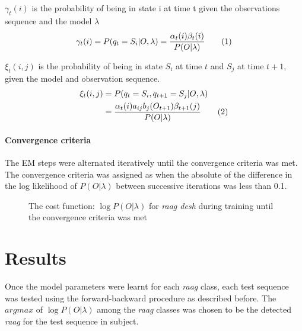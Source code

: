 \documentclass[letterpaper, 10 pt, conference]{ieeeconf}  %
\newcommand\numberthis{\addtocounter{equation}{1}\tag{\theequation}}
\begin{document}
$\gamma_t(i)$ is the probability of being in state i at time t given the observations sequence and the model $\lambda$
\begin{align*}
	\gamma_t(i) =&\; P(q_t = S_i | O, \lambda) = \frac{\alpha_t(i) \beta_t(i)}{P(O | \lambda)} \numberthis \\ 
\end{align*}

$\xi_t(i,j)$ is the probability of being in state $S_i$ at time $t$ and $S_j$ at time $t+1$, given the model and observation sequence. 
\begin{align*}
	\xi_t(i,j) =&\; P(q_t = S_i, q_{t+1} = S_j | O,\lambda) \\
	=&\; \frac{\alpha_t(i) a_{ij} b_j(O_{t+1}) \beta_{t+1}(j)}{P(O|\lambda)} \numberthis \\
\end{align*}

\paragraph{Convergence criteria}
The EM steps were alternated iteratively until the convergence criteria was met. The convergence criteria was assigned as when the absolute of the difference in the log likelihood of $P(O|\lambda)$ between successive iterations was less than 0.1. \\

   \begin{figure}[thpb]
      \centering
      \caption{The cost function: $\log P(O|\lambda)$ for \textit{raag desh} during training until the convergence criteria was met}
      \label{figurelabel}
   \end{figure}

\section{Results}
Once the model parameters were learnt for each \textit{raag} class, each test sequence was tested using the forward-backward procedure as described before. The $argmax$ of $\log P(O|\lambda)$ among the \textit{raag} classes was chosen to be the detected \textit{raag} for the test sequence in subject.\\
\end{document}

